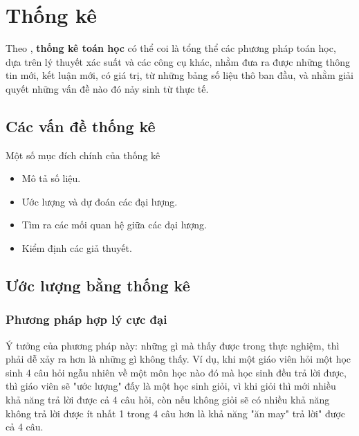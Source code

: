 \chapter{Thống kê}

Theo \cite{nguyentiendung2015}, \textbf{thống kê toán học} có thể coi là tổng thể các phương pháp toán học, dựa trên lý thuyết xác suất và các công cụ khác, nhằm đưa ra được những thông tin mới, kết luận mới, có giá trị, từ những bảng số liệu thô ban đầu, và nhằm giải quyết những vấn đề nào đó nảy sinh từ thực tế.

\section{Các vấn đề thống kê}

Một số mục đích chính của thống kê

\begin{itemize}
  \item Mô tả số liệu.
  \item Ước lượng và dự đoán các đại lượng.
  \item Tìm ra các mối quan hệ giữa các đại lượng.
  \item Kiểm định các giả thuyết.
\end{itemize}

\section{Ước lượng bằng thống kê}

\subsection{Phương pháp hợp lý cực đại}



Ý tưởng của phương pháp này: những gì mà thấy được trong thực nghiệm, thì phải dễ xảy ra hơn là những gì không thấy. Ví dụ, khi một giáo viên hỏi một học sinh 4 câu hỏi ngẫu nhiên về một môn học nào đó mà học sinh đều trả lời được, thì giáo viên sẽ "ước lượng" đấy là một học sinh giỏi, vì khi giỏi thì mới nhiều khả năng trả lời được cả 4 câu hỏi, còn nếu không giỏi sẽ có nhiều khả năng không trả lời được ít nhất 1 trong 4 câu hơn là khả năng "ăn may" trả lời" được cả 4 câu.

